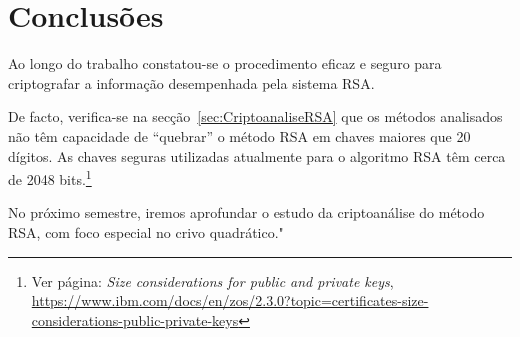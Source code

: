 \chapter{Conclusões}
\label{sec:Conclusoes}
Ao longo do trabalho constatou-se o procedimento eficaz e seguro para criptografar a informação desempenhada  pela sistema RSA.

De facto, verifica-se na secção~\ref{sec:CriptoanaliseRSA} que os métodos analisados não têm capacidade de ``quebrar'' o método RSA em chaves maiores que 20 dígitos. As chaves seguras utilizadas atualmente para o algoritmo RSA têm cerca de 2048 bits.\footnote{Ver página: \emph{Size considerations for public and private keys}, \url{https://www.ibm.com/docs/en/zos/2.3.0?topic=certificates-size-considerations-public-private-keys}}

No próximo semestre, iremos aprofundar o estudo da criptoanálise do método RSA, com foco especial no crivo quadrático."



